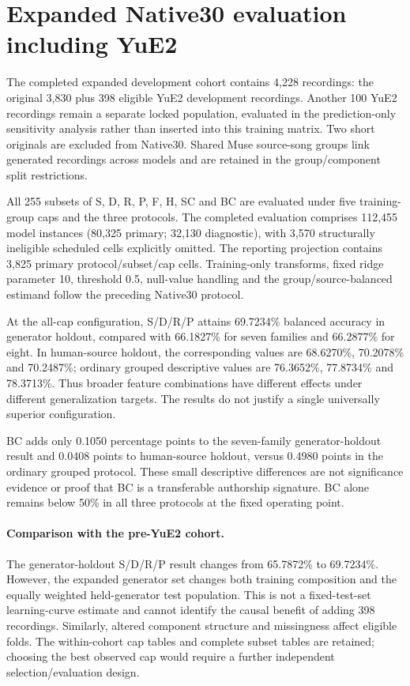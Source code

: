 \section{Expanded Native30 evaluation including YuE2}
\label{sec:yue2-expanded}
The completed expanded development cohort contains 4,228 recordings: the
original 3,830 plus 398 eligible YuE2 development recordings. Another 100
YuE2 recordings remain a separate locked population, evaluated in the
prediction-only sensitivity analysis rather than inserted into this training
matrix. Two short originals are excluded from Native30. Shared Muse source-song
groups link generated recordings across models and are retained in the
group/component split restrictions.

All 255 subsets of S, D, R, P, F, H, SC and BC are evaluated under five
training-group caps and the three protocols. The completed evaluation comprises
112,455 model instances (80,325 primary; 32,130 diagnostic), with 3,570
structurally ineligible scheduled cells explicitly omitted. The reporting
projection contains 3,825 primary protocol/subset/cap cells. Training-only
transforms, fixed ridge parameter 10, threshold 0.5, null-value handling and
the group/source-balanced estimand follow the preceding Native30 protocol.



At the all-cap configuration, S/D/R/P attains 69.7234\% balanced accuracy in
generator holdout, compared with 66.1827\% for seven families and 66.2877\%
for eight. In human-source holdout, the corresponding values are 68.6270\%,
70.2078\% and 70.2487\%; ordinary grouped descriptive values are 76.3652\%,
77.8734\% and 78.3713\%. Thus broader feature combinations have different
effects under different generalization targets. The results do not justify a
single universally superior configuration.

BC adds only 0.1050 percentage points to the seven-family generator-holdout
result and 0.0408 points to human-source holdout, versus 0.4980 points in the
ordinary grouped protocol. These small descriptive differences are not
significance evidence or proof that BC is a transferable authorship signature.
BC alone remains below 50\% in all three protocols at the fixed operating point.

\paragraph{Comparison with the pre-YuE2 cohort.}
The generator-holdout S/D/R/P result changes from 65.7872\% to 69.7234\%.
However, the expanded generator set changes both training composition and the
equally weighted held-generator test population. This is not a fixed-test-set
learning-curve estimate and cannot identify the causal benefit of adding
398 recordings. Similarly, altered component structure and missingness affect
eligible folds. The within-cohort cap tables and complete subset tables are
retained; choosing the best observed cap would require a further independent
selection/evaluation design.

